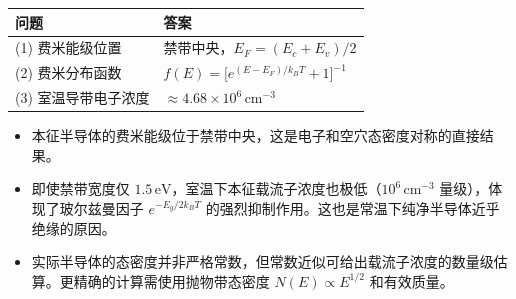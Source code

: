 \begin{formulabox}[答案汇总]
\begin{center}
\begin{tabular}{ll}
\toprule
\textbf{问题} & \textbf{答案} \\
\midrule
(1) 费米能级位置 & 禁带中央，$E_F=(E_c+E_v)/2$ \\
(2) 费米分布函数 & $f(E)=\bigl[e^{(E-E_F)/k_BT}+1\bigr]^{-1}$ \\
(3) 室温导带电子浓度 & $\approx4.68\times10^6\,\text{cm}^{-3}$ \\
\bottomrule
\end{tabular}
\end{center}
\end{formulabox}

\begin{insightbox}[物理图像]
\begin{itemize}
    \item 本征半导体的费米能级位于禁带中央，这是电子和空穴态密度对称的直接结果。
    \item 即使禁带宽度仅 $1.5\,\text{eV}$，室温下本征载流子浓度也极低（$10^6\,\text{cm}^{-3}$ 量级），体现了玻尔兹曼因子 $e^{-E_g/2k_BT}$ 的强烈抑制作用。这也是常温下纯净半导体近乎绝缘的原因。
    \item 实际半导体的态密度并非严格常数，但常数近似可给出载流子浓度的数量级估算。更精确的计算需使用抛物带态密度 $N(E)\propto E^{1/2}$ 和有效质量。
\end{itemize}
\end{insightbox}
